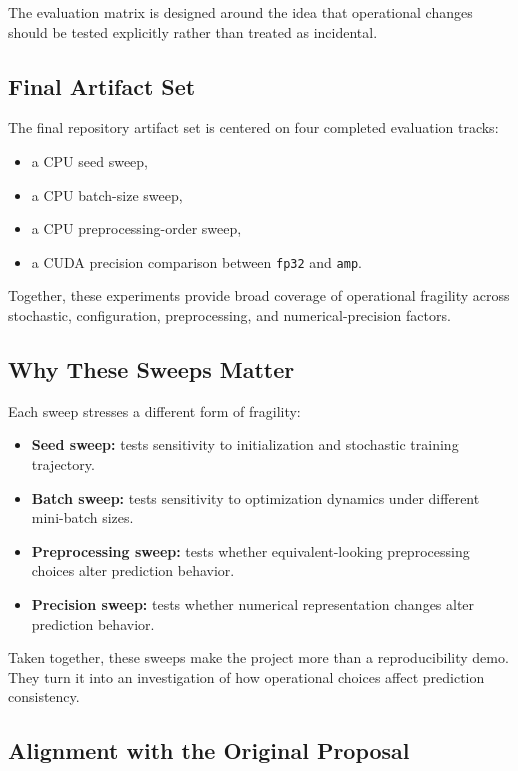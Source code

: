 \documentclass[conference]{IEEEtran}
\begin{document}
The evaluation matrix is designed around the idea that operational changes should be tested explicitly rather than treated as incidental.

\subsection{Final Artifact Set}

The final repository artifact set is centered on four completed evaluation tracks:
\begin{itemize}
\item a CPU seed sweep,
\item a CPU batch-size sweep,
\item a CPU preprocessing-order sweep,
\item a CUDA precision comparison between \texttt{fp32} and \texttt{amp}.
\end{itemize}

Together, these experiments provide broad coverage of operational fragility across stochastic, configuration, preprocessing, and numerical-precision factors.

\subsection{Why These Sweeps Matter}

Each sweep stresses a different form of fragility:
\begin{itemize}
\item \textbf{Seed sweep:} tests sensitivity to initialization and stochastic training trajectory.
\item \textbf{Batch sweep:} tests sensitivity to optimization dynamics under different mini-batch sizes.
\item \textbf{Preprocessing sweep:} tests whether equivalent-looking preprocessing choices alter prediction behavior.
\item \textbf{Precision sweep:} tests whether numerical representation changes alter prediction behavior.
\end{itemize}

Taken together, these sweeps make the project more than a reproducibility demo. They turn it into an investigation of how operational choices affect prediction consistency.

\subsection{Alignment with the Original Proposal}
\end{document}

